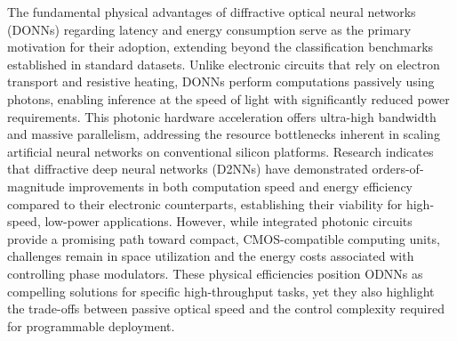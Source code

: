 \documentclass[11pt]{article}
\begin{document}
The fundamental physical advantages of diffractive optical neural networks (DONNs) regarding latency and energy consumption serve as the primary motivation for their adoption, extending beyond the classification benchmarks established in standard datasets. Unlike electronic circuits that rely on electron transport and resistive heating, DONNs perform computations passively using photons, enabling inference at the speed of light with significantly reduced power requirements. This photonic hardware acceleration offers ultra-high bandwidth and massive parallelism, addressing the resource bottlenecks inherent in scaling artificial neural networks on conventional silicon platforms. Research indicates that diffractive deep neural networks (D2NNs) have demonstrated orders-of-magnitude improvements in both computation speed and energy efficiency compared to their electronic counterparts, establishing their viability for high-speed, low-power applications. \citep{doi_10_48550_arxiv_2305_03627_fb0d0b27} \citep{s2_e9e6fc7353675c8e70b11e4ba8a931d959c2e912_909a5a0c} However, while integrated photonic circuits provide a promising path toward compact, CMOS-compatible computing units, challenges remain in space utilization and the energy costs associated with controlling phase modulators. These physical efficiencies position ODNNs as compelling solutions for specific high-throughput tasks, yet they also highlight the trade-offs between passive optical speed and the control complexity required for programmable deployment. \citep{doi_10_1002_lpor_202200348_d54cae18} \citep{doi_10_1109_dac18074_2021_9586204_0c48190f} \citep{doi_10_1038_s41467_022_28702_0_1b79b43c}
\end{document}
